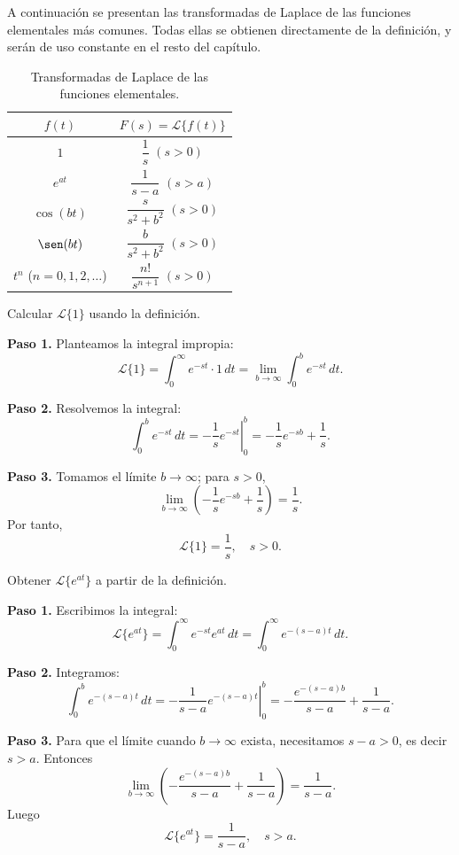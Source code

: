 A continuación se presentan las transformadas de Laplace de las funciones elementales más comunes. Todas ellas se obtienen directamente de la definición, y serán de uso constante en el resto del capítulo.

\begin{table}[H]
\centering
\begin{tabular}{c|c}
$f(t)$ & $F(s)=\mathcal{L}\{f(t)\}$ \\ \hline
$1$ & $\dfrac{1}{s}$ \quad $(s>0)$ \\[6pt]
$e^{at}$ & $\dfrac{1}{s-a}$ \quad $(s>a)$ \\[6pt]
$\cos(bt)$ & $\dfrac{s}{s^2+b^2}$ \quad $(s>0)$ \\[6pt]
$\sen(bt)$ & $\dfrac{b}{s^2+b^2}$ \quad $(s>0)$ \\[6pt]
$t^n$ ($n=0,1,2,\dots$) & $\dfrac{n!}{s^{n+1}}$ \quad $(s>0)$
\end{tabular}
\caption{Transformadas de Laplace de las funciones elementales.}
\end{table}

\begin{example}[Cálculo directo de la transformada de $f(t)=1$]
Calcular $\mathcal{L}\{1\}$ usando la definición.
\begin{myproof}
\textbf{Paso 1.} Planteamos la integral impropia:
\[
\mathcal{L}\{1\} = \int_0^\infty e^{-st}\cdot 1\,dt = \lim_{b\to\infty}\int_0^b e^{-st}\,dt.
\]

\textbf{Paso 2.} Resolvemos la integral:
\[
\int_0^b e^{-st}\,dt = \left.-\frac{1}{s}e^{-st}\right|_0^b = -\frac{1}{s}e^{-sb} + \frac{1}{s}.
\]

\textbf{Paso 3.} Tomamos el límite $b\to\infty$; para $s>0$,
\[
\lim_{b\to\infty}\left(-\frac{1}{s}e^{-sb}+\frac{1}{s}\right) = \frac{1}{s}.
\]
Por tanto,
\[
\boxed{\mathcal{L}\{1\} = \frac{1}{s},\quad s>0.}
\]
\end{myproof}
\end{example}

\begin{example}[Cálculo directo de la transformada de $f(t)=e^{at}$]
Obtener $\mathcal{L}\{e^{at}\}$ a partir de la definición.
\begin{myproof}
\textbf{Paso 1.} Escribimos la integral:
\[
\mathcal{L}\{e^{at}\} = \int_0^\infty e^{-st} e^{at}\,dt = \int_0^\infty e^{-(s-a)t}\,dt.
\]

\textbf{Paso 2.} Integramos:
\[
\int_0^b e^{-(s-a)t}\,dt = \left.-\frac{1}{s-a}e^{-(s-a)t}\right|_0^b = -\frac{e^{-(s-a)b}}{s-a} + \frac{1}{s-a}.
\]

\textbf{Paso 3.} Para que el límite cuando $b\to\infty$ exista, necesitamos $s-a>0$, es decir $s>a$. Entonces
\[
\lim_{b\to\infty}\left(-\frac{e^{-(s-a)b}}{s-a} + \frac{1}{s-a}\right) = \frac{1}{s-a}.
\]
Luego
\[
\boxed{\mathcal{L}\{e^{at}\} = \frac{1}{s-a},\quad s>a.}
\]
\end{myproof}
\end{example}

